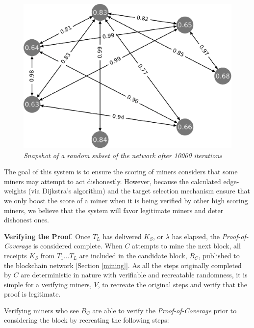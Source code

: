 \documentclass[10pt, nonatbib, nocopyrightspace, reprint]{sigplanconf}
\begin{document}
\begin{figure}[H]
    \begin{center}
          \includegraphics[width=0.8\columnwidth]{chart1000.eps}
          \caption{\emph{Snapshot of a random subset of the network after 10000 iterations}}
          \label{fig:score-graph10000}
     \end{center}
\end{figure}

The goal of this system is to ensure the scoring of miners considers that some miners may attempt to act dishonestly. However, because the calculated edge-weights (via Dijkstra's algorithm) and the target selection mechanism ensure that we only boost the score of a miner when it is being verified by other high scoring miners, we believe that the system will favor legitimate miners and deter dishonest ones.

\textbf{Verifying the Proof}. Once $T_L$ has delivered $K_S$, or $\lambda$ has elapsed, the \emph{Proof-of-Coverage} is considered complete. When $C$ attempts to mine the next block, all receipts $K_S$ from $T_1$...$T_L$ are included in the candidate block, $B_C$, published to the blockchain network [Section \ref{mining}]. As all the steps originally completed by $C$ are deterministic in nature with verifiable and recreatable randomness, it is simple for a verifying miners, $V$, to recreate the original steps and verify that the proof is legitimate.

Verifying miners who see $B_C$ are able to verify the \emph{Proof-of-Coverage} prior to considering the block by recreating the following steps:
\end{document}
